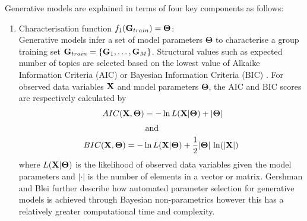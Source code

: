 Generative models are explained in terms of four key components as follows: %
\begin{enumerate}[1.]

\item Characterisation function $f_1({\bf G}_{train})= \boldsymbol\Theta$: \\   Generative models  infer a set of model parameters $\boldsymbol\Theta$   to characterise a group training set ${\bf G}_{train}=\{{\bf G}_{1},\dots,{\bf G}_{M}\}$. Structural values such as expected number of topics are selected based on the lowest value of Alkaike Information Criteria (AIC) \cite{AIC} 
 or Bayesian Information Criteria (BIC) \cite{BIC}. 
For observed data variables ${\bf X}$ and model parameters $\boldsymbol\Theta$, the
AIC and BIC scores are respectively calculated  by
\begin{align}%
& \hspace{8mm} AIC({\bf X}, \boldsymbol\Theta)=-\ln L({\bf X}| \boldsymbol\Theta)+|
\boldsymbol\Theta | \label{AIC} \\[1mm]
& \hspace{25mm}\mbox{ and} \nonumber \\ 
& BIC({\bf X}, \boldsymbol\Theta)=-\ln L({\bf X}| \boldsymbol\Theta)+\frac{1}{2}|
\boldsymbol\Theta|\, \ln (|{\bf X}|)\label{BIC}
\end{align}
where $L({\bf X}|\boldsymbol\Theta)$ is the likelihood of observed data variables given the model parameters and $|\cdot|$ is the number of elements in a  vector or matrix. 
Gershman and  Blei \cite{NPB} further describe how automated parameter selection for generative models is achieved through Bayesian non-parametrics however this has a relatively greater computational  time and complexity. 
\end{enumerate}



 
 
